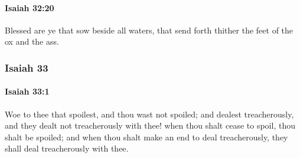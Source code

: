 		\paragraph{Isaiah 32:20} %
			\label{ISAIAH-32-20}

			Blessed are ye that sow beside all waters, that send forth thither the feet of the ox and the ass.

	\subsubsection{Isaiah 33} %
		\label{ISAIAH-33}

		\paragraph{Isaiah 33:1} %
			\label{ISAIAH-33-1}

			Woe to thee that spoilest, and thou wast not spoiled; and dealest treacherously, and they dealt not treacherously with thee! when thou shalt cease to spoil, thou shalt be spoiled; and when thou shalt make an end to deal treacherously, they shall deal treacherously with thee.

